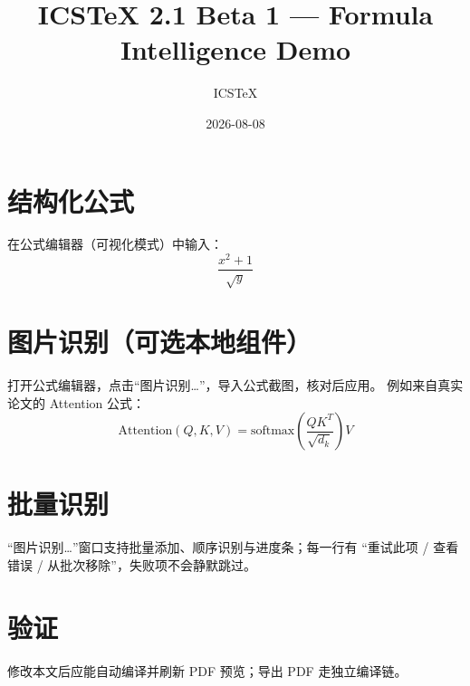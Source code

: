 \documentclass{article}
\title{ICSTeX 2.1 Beta 1 --- Formula Intelligence Demo}
\author{ICSTeX}
\date{2026-08-08}
\begin{document}
\maketitle

\section{结构化公式}
在公式编辑器（可视化模式）中输入：
\[
\frac{x^2+1}{\sqrt{y}}
\]

\section{图片识别（可选本地组件）}
打开公式编辑器，点击“图片识别…”，导入公式截图，核对后应用。
例如来自真实论文的 Attention 公式：
\[
\mathrm{Attention}(Q, K, V) = \mathrm{softmax}\left(\frac{QK^T}{\sqrt{d_k}}\right)V
\]

\section{批量识别}
“图片识别…”窗口支持批量添加、顺序识别与进度条；每一行有
“重试此项 / 查看错误 / 从批次移除”，失败项不会静默跳过。

\section{验证}
修改本文后应能自动编译并刷新 PDF 预览；导出 PDF 走独立编译链。
\end{document}
